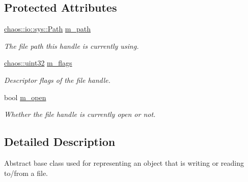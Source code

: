 \subsection*{Protected Attributes}
\begin{DoxyCompactItemize}
\item 
\hypertarget{classchaos_1_1io_1_1sys_1_1_file_handle_a8e6a9c9ab7d7abec8fc2bbcf595cfba1}{\hyperlink{classchaos_1_1io_1_1sys_1_1_path}{chaos\-::io\-::sys\-::\-Path} \hyperlink{classchaos_1_1io_1_1sys_1_1_file_handle_a8e6a9c9ab7d7abec8fc2bbcf595cfba1}{m\-\_\-path}}\label{classchaos_1_1io_1_1sys_1_1_file_handle_a8e6a9c9ab7d7abec8fc2bbcf595cfba1}

\begin{DoxyCompactList}\small\item\em The file path this handle is currently using. \end{DoxyCompactList}\item 
\hypertarget{classchaos_1_1io_1_1sys_1_1_file_handle_aa6a2c99d5e0b94ed1d9c4b511352f78a}{\hyperlink{namespacechaos_a8641b3ae4551f0b35570d4f9f4ec22d9}{chaos\-::uint32} \hyperlink{classchaos_1_1io_1_1sys_1_1_file_handle_aa6a2c99d5e0b94ed1d9c4b511352f78a}{m\-\_\-flags}}\label{classchaos_1_1io_1_1sys_1_1_file_handle_aa6a2c99d5e0b94ed1d9c4b511352f78a}

\begin{DoxyCompactList}\small\item\em Descriptor flags of the file handle. \end{DoxyCompactList}\item 
\hypertarget{classchaos_1_1io_1_1sys_1_1_file_handle_a4047ce2fadb3410ce99b5869da16007d}{bool \hyperlink{classchaos_1_1io_1_1sys_1_1_file_handle_a4047ce2fadb3410ce99b5869da16007d}{m\-\_\-open}}\label{classchaos_1_1io_1_1sys_1_1_file_handle_a4047ce2fadb3410ce99b5869da16007d}

\begin{DoxyCompactList}\small\item\em Whether the file handle is currently open or not. \end{DoxyCompactList}\end{DoxyCompactItemize}


\subsection{Detailed Description}
Abstract base class used for representing an object that is writing or reading to/from a file. 

